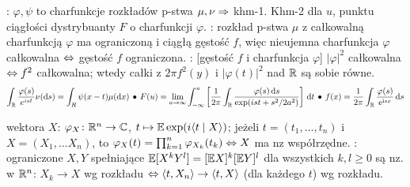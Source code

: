 :   $\varphi, \psi$ to charfunkcje rozkładów p-stwa $\mu, \nu \Rightarrow$ khm-1.
Khm-2 dla $u$, punktu ciągłości dystrybuanty $F$ o charfunkcji $\varphi$.
: rozkład p-stwa $\mu$ z całkowalną charfunkcją $\varphi$ ma ograniczoną i ciągłą gęstość $f$, więc nieujemna charfunkcja $\varphi$ całkowalna $\Leftrightarrow$ gęstość $f$ ograniczona.
: [gęstość $f$ i charfunkcja $\varphi$] $|\varphi|^2$ całkowalna $\Leftrightarrow f^2$ całkowalna; wtedy całki z $2 \pi f^2(y)$ i $|\varphi(t)|^2$ nad $\mathbb{R}$ są sobie równe.
 \[
 	\int_{\mathbb{R}} \frac{\varphi(s)}{e^{ist}} \nu(\textrm{d} s) = \int_R \psi(x-t) \mu (\textrm{d} x) \, \bullet \,
 	F(u) = \lim_{a \to \infty} \int_{-\infty}^u \left[\frac{1}{2\pi} \int_{\mathbb{R}} \frac{\varphi(s) \, \textrm{d} s}{\exp (ist + s^2/2a^2)} \right] \, \textrm{d} t \, \bullet \,
 	f(x) = \frac{1}{2\pi} \int_{\mathbb{R}} \frac{\varphi(s)}{\textrm{e}^{\textrm{i}sx}} \, \textrm{d} s 
 \]

 wektora $X$: $\varphi_X \colon \mathbb{R}^n \to \mathbb{C}$, $t \mapsto \mathbb{E} \exp (i \langle t \mid X \rangle)$; jeżeli $t = (t_1, \ldots, t_n)$ i $X = (X_1, \ldots X_n)$, to $\varphi_{X}(t) = \prod_{k=1}^n \varphi_{X_k}(t_k) \Leftrightarrow X$ ma nz współrzędne.
: ograniczone $X, Y$ spełniające $\mathbb{E} [X^k Y^l] = [\mathbb{E} X]^k [\mathbb{E} Y]^l$ dla wszystkich $k, l \ge 0$ są nz.
 w $\mathbb{R}^n$: $X_k \to X$ wg rozkładu $\Leftrightarrow \langle t, X_n \rangle \to \langle t, X\rangle$ (dla każdego $t$) wg rozkładu.